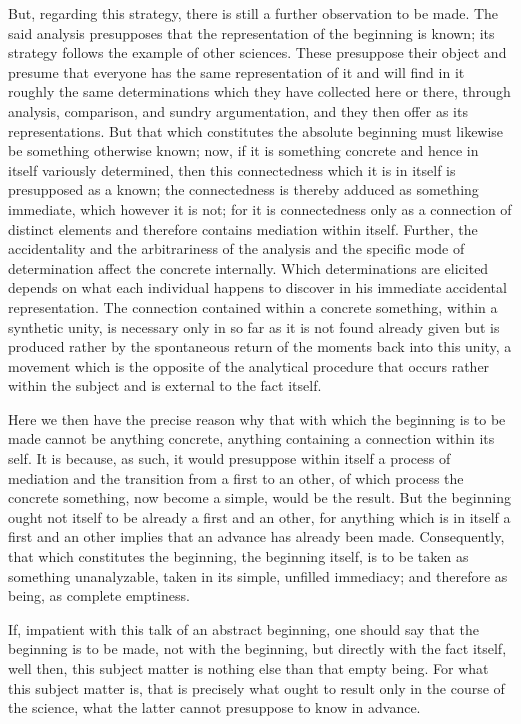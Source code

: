But, regarding this strategy, there is still
a further observation to be made.
The said analysis presupposes that
the representation of the beginning is known;
its strategy follows the example of other sciences.
These presuppose their object and presume that everyone has
the same representation of it
and will find in it roughly the same determinations
which they have collected here or there,
through analysis, comparison, and sundry argumentation,
and they then offer as its representations.
But that which constitutes the absolute beginning must
likewise be something otherwise known;
now, if it is something concrete
and hence in itself variously determined,
then this connectedness which it is
in itself is presupposed as a known;
the connectedness is thereby adduced
as something immediate, which however it is not;
for it is connectedness only as
a connection of distinct elements
and therefore contains mediation within itself.
Further, the accidentality and the arbitrariness of the analysis
and the specific mode of determination
affect the concrete internally.
Which determinations are elicited depends
on what each individual happens to discover
in his immediate accidental representation.
The connection contained within a concrete something,
within a synthetic unity, is necessary only in so far
as it is not found already given but is produced rather
by the spontaneous return of the moments back into this unity,
a movement which is the opposite of the analytical
procedure that occurs rather within the subject
and is external to the fact itself.

Here we then have the precise reason why that with which
the beginning is to be made cannot be anything concrete,
anything containing a connection within its self.
It is because, as such, it would presuppose within
itself a process of mediation
and the transition from a first to an other,
of which process the concrete something,
now become a simple, would be the result.
But the beginning ought not itself to be
already a first and an other,
for anything which is in itself a first and an other
implies that an advance has already been made.
Consequently, that which constitutes the beginning,
the beginning itself, is to be taken as something unanalyzable,
taken in its simple, unfilled immediacy;
and therefore as being, as complete emptiness.

If, impatient with this talk of an abstract beginning,
one should say that the beginning is to be made,
not with the beginning, but directly with the fact itself,
well then, this subject matter is nothing else
than that empty being.
For what this subject matter is,
that is precisely what ought to result
only in the course of the science,
what the latter cannot presuppose to know in advance.

